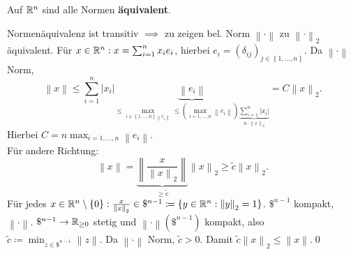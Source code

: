 \begin{subtheorem}
	Auf $ \mathbb{R} ^n $ sind alle Normen \textbf{äquivalent}.
\end{subtheorem}

\begin{subproof*}
	Normenäquivalenz ist transitiv $ \implies  $ zu zeigen bel. Norm $ \left\| \cdot  \right\| $ zu $ \left\| \cdot  \right\| _2 $ äquivalent.
	Für $ x \in \mathbb{R} ^n : x = \sum_{i=1}^{n} x_i e_i $, hierbei $ e_i = (\delta_{ij})_{j \in \left\{ 1, \dotsc, n \right\} }   $.
	Da $ \left\| \cdot  \right\|  $ Norm, 
	\[
		\left\| x \right\| \leq \sum_{i=1}^{n} \left| x_i \right| \underbrace{\left\| e_i \right\| }_{\leq \max_{i \in \left\{ 1, \dotsc, n \right\} \left\| e_i \right\| } \leq  \left( \max_{i= 1, \dotsc, n} \left\| e_i \right\|  \right) \underbrace{\sum_{i=1}^{n} \left| x_i \right|}_{n \cdot \left\| x \right\| _2}} = C\left\| x \right\| _2.
	\]
	Hierbei $ C = n \max_{i = 1, \dotsc, n} \left\| e_i \right\|  $.\\
	Für andere Richtung: 
	\[
		\left\| x \right\| = \underbrace{\left\| \frac{ x }{ \left\| x \right\| _2 }  \right\| }_{\geq \tilde c} \left\| x \right\| _2 \geq \tilde c \left\| x \right\| _2.
	\]
	Für jedes $ x \in \mathbb{R} ^n\setminus \left\{ 0 \right\} : \frac{ x }{ \left\| x \right\| _2 } \in \mathdollar ^{n - 1} \coloneqq \left\{ y \in \mathbb{R} ^n : \left\| y \right\| _2 = 1 \right\}  $.
	$ \mathdollar ^{n - 1}  $ kompakt, $ \left\| \cdot  \right\|  $.
	$ \mathdollar ^{n - 1} \to \mathbb{R} _{\geq 0}  $ stetig und $ \left\| \cdot  \right\| (\mathdollar ^{n - 1} ) $ kompakt,
	also $ \tilde c \coloneqq \min_{z \in \mathdollar ^{n - 1} } \left\| z \right\|  $.
	Da $ \left\| \cdot  \right\| $ Norm, $ \tilde c > 0 $. Damit $ \tilde c \left\| x \right\| _2 \leq \left\| x \right\|  $.\qed
\end{subproof*}

